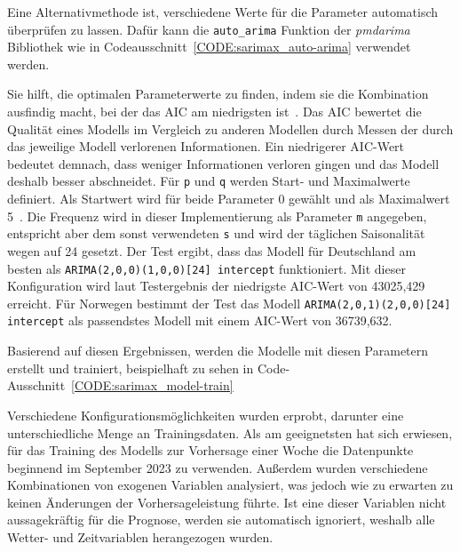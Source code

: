 Eine Alternativmethode ist, verschiedene Werte für die Parameter automatisch überprüfen zu lassen.
Dafür kann die \lstinline[columns=fixed]{auto_arima} Funktion der \textit{pmdarima} Bibliothek wie in Codeausschnitt~\ref{CODE:sarimax_auto-arima} verwendet werden.

Sie hilft, die optimalen Parameterwerte zu finden, indem sie die Kombination ausfindig macht, bei der das \ac{AIC} am niedrigsten ist~\cite{Rahmadhan.8.5.2023}.
Das \ac{AIC} bewertet die Qualität eines Modells im Vergleich zu anderen Modellen durch Messen der durch das jeweilige Modell verlorenen Informationen.
Ein niedrigerer \ac{AIC}-Wert bedeutet demnach, dass weniger Informationen verloren gingen und das Modell deshalb besser abschneidet.
Für \lstinline[columns=fixed]{p} und \lstinline[columns=fixed]{q} werden Start- und Maximalwerte definiert.
Als Startwert wird für beide Parameter 0 gewählt und als Maximalwert 5~\cite{Peixeiro.2022}.
Die Frequenz wird in dieser Implementierung als Parameter \lstinline[columns=fixed]{m} angegeben, entspricht aber dem sonst verwendeten \lstinline[columns=fixed]{s} und wird der täglichen Saisonalität wegen auf 24 gesetzt.
Der Test ergibt, dass das Modell für Deutschland am besten als \lstinline[columns=fixed]{ARIMA(2,0,0)(1,0,0)[24] intercept} funktioniert.
Mit dieser Konfiguration wird laut Testergebnis der niedrigste \ac{AIC}-Wert von 43025,429 erreicht.
Für Norwegen bestimmt der Test das Modell \lstinline[columns=fixed]{ARIMA(2,0,1)(2,0,0)[24] intercept} als passendstes Modell mit einem \ac{AIC}-Wert von 36739,632.

Basierend auf diesen Ergebnissen, werden die Modelle mit diesen Parametern erstellt und trainiert, beispielhaft zu sehen in Code-Ausschnitt~\ref{CODE:sarimax_model-train}


Verschiedene Konfigurationsmöglichkeiten wurden erprobt, darunter eine unterschiedliche Menge an Trainingsdaten.
Als am geeignetsten hat sich erwiesen, für das Training des Modells zur Vorhersage einer Woche die Datenpunkte beginnend im September 2023 zu verwenden.
Außerdem wurden verschiedene Kombinationen von exogenen Variablen analysiert, was jedoch wie zu erwarten zu keinen Änderungen der Vorhersageleistung führte.
Ist eine dieser Variablen nicht aussagekräftig für die Prognose, werden sie automatisch ignoriert, weshalb alle Wetter- und Zeitvariablen herangezogen wurden.

